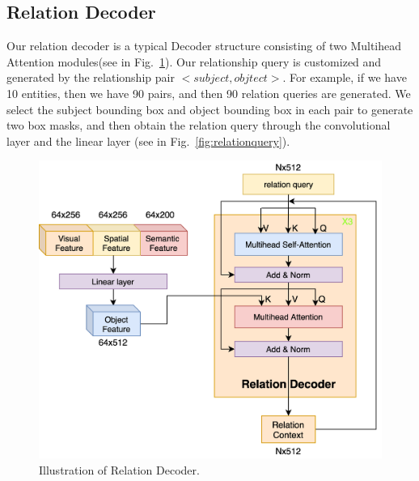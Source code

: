 \subsection{Relation Decoder}

Our relation decoder is a typical Decoder structure consisting of two Multihead Attention modules(see in Fig.~\ref{fig:relationdecoder}). Our relationship query is customized and generated by the relationship pair $<subject,objtect>$. For example, if we have 10 entities, then we have 90 pairs, and then 90 relation queries are generated. We select the subject bounding box and object bounding box in each pair to generate two box masks, and then obtain the relation query  through the convolutional layer and the linear layer (see in Fig.~\ref{fig:relationquery}).



\begin{figure}[tbph!]
	\centering
	\includegraphics[width=1\linewidth]{figures/relation_decoder}
	\caption[Illustration of Relation Decoder]{Illustration of Relation Decoder.}
	\label{fig:relationdecoder}
\end{figure}


